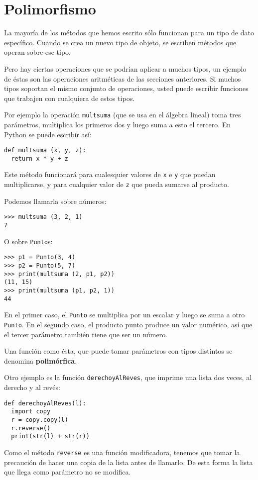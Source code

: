 \section{Polimorfismo}


La mayoría de los métodos que hemos escrito sólo funcionan para un
tipo de dato específico. Cuando se crea un nuevo tipo de objeto, se
escriben métodos que operan sobre ese tipo.

Pero hay ciertas operaciones que se podrían aplicar a muchos tipos,
un ejemplo de éstas son las operaciones aritméticas de las secciones
anteriores. Si muchos tipos soportan el mismo conjunto de operaciones,
usted puede escribir funciones que trabajen con cualquiera de estos
tipos.

Por ejemplo la operación \texttt{multsuma} (que se usa en el álgebra
lineal) toma tres parámetros, multiplica los primeros dos y luego
suma a esto el tercero. En Python se puede escribir así:

\begin{verbatim}
def multsuma (x, y, z):
  return x * y + z
\end{verbatim}
 Este método funcionará para cualesquier valores de \texttt{x} e \texttt{y}
que puedan multiplicarse, y para cualquier valor de \texttt{z} que
pueda sumarse al producto.

Podemos llamarla sobre números:

\begin{verbatim}
>>> multsuma (3, 2, 1)
7
\end{verbatim}
 O sobre \texttt{Punto}s:
\begin{verbatim}
>>> p1 = Punto(3, 4)
>>> p2 = Punto(5, 7)
>>> print(multsuma (2, p1, p2))
(11, 15)
>>> print(multsuma (p1, p2, 1))
44
\end{verbatim}

En el primer caso, el \texttt{Punto} se multiplica por un escalar
y luego se suma a otro \texttt{Punto}. En el segundo caso, el producto
punto produce un valor numérico, así que el tercer parámetro también
tiene que ser un número.

Una función como ésta, que puede tomar parámetros con tipos distintos
se denomina \textbf{polimórfica}.

Otro ejemplo es la función \texttt{derechoyAlReves}, que imprime una
lista dos veces, al derecho y al revés:

\begin{verbatim}
def derechoyAlReves(l):
  import copy
  r = copy.copy(l)
  r.reverse()
  print(str(l) + str(r))
\end{verbatim}
 Como el método \texttt{reverse} es una función modificadora, tenemos
que tomar la precaución de hacer una copia de la lista antes de llamarlo.
De esta forma la lista que llega como parámetro no se modifica.


